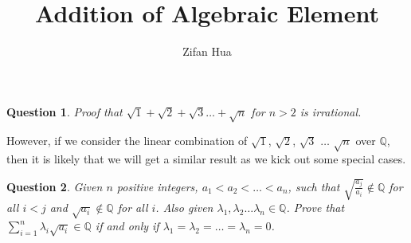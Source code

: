 \documentclass{article}
\title{Addition of Algebraic Element}
\author{Zifan Hua}
\newtheorem{question}{Question}[section]
\begin{document}
    \begin{question}
        Proof that $ \sqrt{1} + \sqrt{2} + \sqrt{3} \dots + \sqrt{n} $ for $ n > 2 $ is irrational.
    \end{question}

    However, if we consider the linear combination of 
    $ \sqrt{1} $, $ \sqrt{2} $, $ \sqrt{3} $ $ \dots $ $ \sqrt{n} $ over $ \mathbb{Q} $, 
    then it is likely that we will get a similar result as we  kick out some special cases.

    \begin{question}
        Given $ n $ positive integers, $ a_1 < a_2 < \dots < a_n $, 
        such that $ \sqrt{\frac{a_{j}}{a_{i}}} \notin \mathbb{Q} $ for all $ i < j $ 
        and $ \sqrt{a_{i}} \notin \mathbb{Q} $ for all $i$. 
        Also given $ \lambda_{1}, \lambda_{2} \dots \lambda_{n} \in \mathbb{Q} $. 
        Prove that $ \sum_{i=1}^{n} \lambda_{i} \sqrt{a_{i}} \in \mathbb{Q}$ 
        if and only if $ \lambda_{1} = \lambda_{2} = \dots = \lambda_{n} = 0$.
    \end{question}
\end{document}
